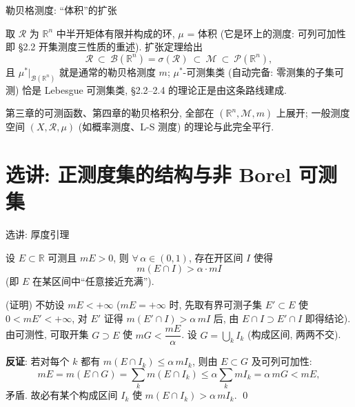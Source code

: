 
\begin{frame}{勒贝格测度: ``体积''的扩张}

\begin{thm}[勒贝格测度作为扩张特例]
取 $\mathscr{R}$ 为 $\mathbb{R}^n$ 中\alert{半开矩体有限并}构成的环, $\mu$ = 体积 (它是环上的测度: 可列可加性即 §2.2 开集测度三性质的重述). 扩张定理给出
\[
\mathscr{R} \ \subset\ \mathscr{B}(\mathbb{R}^n) = \sigma(\mathscr{R}) \ \subset\ \mathscr{M} \ \subset\ \mathscr{P}(\mathbb{R}^n),
\]
且 $\mu^*\big|_{\mathscr{B}(\mathbb{R}^n)}$ 就是通常的勒贝格测度 $m$; $\mu^*$-可测集类 (自动完备: 零测集的子集可测) 恰是 \alert{Lebesgue 可测集类}, §2.2--2.4 的理论正是由这条路线建成.
\end{thm}

\pause

\begin{remark}
第三章的可测函数、第四章的勒贝格积分, 全部在 $(\mathbb{R}^n, \mathscr{M}, m)$ 上展开; 一般测度空间 $(X, \mathscr{R}, \mu)$ (如概率测度、L-S 测度) 的理论与此完全平行.
\end{remark}

\end{frame}


\section[非 Borel 集]{选讲: 正测度集的结构与非 Borel 可测集}


\graymode

\begin{frame}{选讲: 厚度引理}

\begin{lem}[厚度引理]
设 $E \subset \mathbb{R}$ 可测且 $mE > 0$, 则 $\forall\, \alpha \in (0, 1)$, 存在开区间 $I$ 使得
\[
m(E \cap I) > \alpha \cdot mI
\]
(即 $E$ 在某区间中``任意接近充满'').
\end{lem}

\startproof[bg=yellow, fg=red](证明)
不妨设 $mE < +\infty$ ($mE = +\infty$ 时, 先取有界可测子集 $E' \subset E$ 使 $0 < mE' < +\infty$, 对 $E'$ 证得 $m(E' \cap I) > \alpha\, mI$ 后, 由 $E \cap I \supset E' \cap I$ 即得结论). 由可测性, 可取开集 $G \supset E$ 使 $mG < \dfrac{mE}{\alpha}$. 设 $G = \bigcup_k I_k$ (构成区间, 两两不交).

\pause

\textbf{反证}: 若对每个 $k$ 都有 $m(E \cap I_k) \leqslant \alpha \, mI_k$, 则由 $E \subset G$ 及可列可加性:
\[
mE = m(E \cap G) = \sum_k m(E \cap I_k) \leqslant \alpha \sum_k mI_k = \alpha\, mG < mE,
\]
矛盾. 故必有某个构成区间 $I_k$ 使 $m(E \cap I_k) > \alpha\, mI_k$.
\qed

\end{frame}

